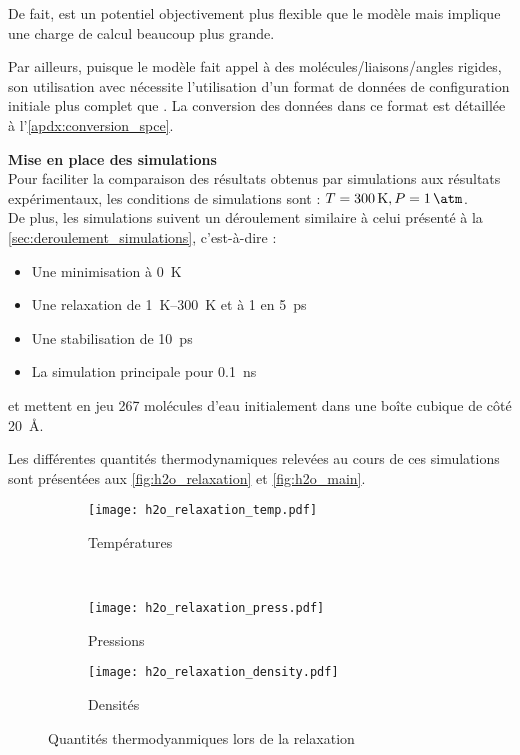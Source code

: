 De fait, \reaxff{} est un potentiel objectivement plus flexible que le modèle \spce{} mais implique une charge de calcul beaucoup plus grande.

Par ailleurs, puisque le modèle \spce{} fait appel à des molécules/liaisons/angles rigides, son utilisation avec \lammps{} nécessite l'utilisation d'un format de données de configuration initiale plus complet que \reaxff{}. La conversion des données dans ce format est détaillée à l'\autoref{apdx:conversion_spce}.

\textbf{Mise en place des simulations}\\
Pour faciliter la comparaison des résultats obtenus par simulations aux résultats expérimentaux, les conditions de simulations sont : $T = \qty{300}{\kelvin}, P = \qty{1}{\atm}$.\\
De plus, les simulations suivent un déroulement similaire à celui présenté à la \autoref{sec:deroulement_simulations}, c'est-à-dire :
\begin{itemize}
    \item Une minimisation à \qty{0}{\kelvin}
    \item Une relaxation de \qtyrange{1}{300}{\kelvin} et à \qty{1}{\atm} en \qty{5}{\pico \second}
    \item Une stabilisation de \qty{10}{\pico \second}
    \item La simulation principale pour \qty{0.1}{\nano \second}
\end{itemize}
et mettent en jeu \num{267} molécules d'eau initialement dans une boîte cubique de côté \qty{20}{\angstrom}.

Les différentes quantités thermodynamiques relevées au cours de ces simulations sont présentées aux \autoref{fig:h2o_relaxation} et \ref{fig:h2o_main}.

\begin{figure}[h!]
    \centering
    \begin{subfigure}{.49\textwidth}
        \texttt{[image: h2o\_relaxation\_temp.pdf]}
        \caption{Températures}
    \end{subfigure}%
    ~
    \begin{subfigure}{.49\textwidth}
        \texttt{[image: h2o\_relaxation\_press.pdf]}
        \caption{Pressions}
    \end{subfigure}
    \begin{subfigure}{.49\textwidth}
        \texttt{[image: h2o\_relaxation\_density.pdf]}
        \caption{Densités}
    \end{subfigure}
    \caption{Quantités thermodyanmiques lors de la relaxation}
    \label{fig:h2o_relaxation}
\end{figure}

